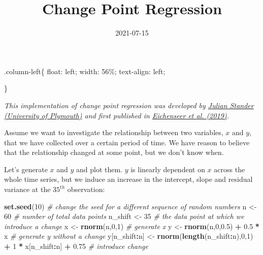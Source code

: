 \documentclass[]{article}
\title{Change Point Regression}
\author{}
\date{\vspace{-2.5em}2021-07-15}
\newenvironment{Shaded}{\begin{snugshade}}{\end{snugshade}}
\newcommand{\KeywordTok}[1]{\textcolor[rgb]{0.13,0.29,0.53}{\textbf{#1}}}
\newcommand{\DecValTok}[1]{\textcolor[rgb]{0.00,0.00,0.81}{#1}}
\newcommand{\FloatTok}[1]{\textcolor[rgb]{0.00,0.00,0.81}{#1}}
\newcommand{\StringTok}[1]{\textcolor[rgb]{0.31,0.60,0.02}{#1}}
\newcommand{\CommentTok}[1]{\textcolor[rgb]{0.56,0.35,0.01}{\textit{#1}}}
\newcommand{\OperatorTok}[1]{\textcolor[rgb]{0.81,0.36,0.00}{\textbf{#1}}}
\newcommand{\NormalTok}[1]{#1}
\begin{document}
\maketitle

.column-left\{ float: left; width: 56\%; text-align: left;

\}

\emph{This implementation of change point regression was developed by
\href{https://www.plymouth.ac.uk/staff/julian-stander}{Julian Stander
(University of Plymouth)} and first published in
\href{https://www.nature.com/articles/s41561-019-0392-9}{Eichenseer et
al. (2019)}.}

Assume we want to investigate the relationship between two variables,
\(x\) and \(y\), that we have collected over a certain period of time.
We have reason to believe that the relationship changed at some point,
but we don't know when.

Let's generate \(x\) and \(y\) and plot them. \(y\) is linearly
dependent on \(x\) across the whole time series, but we induce an
increase in the intercept, slope and residual variance at the
\(35^{th}\) observation:

\begin{Shaded}
\begin{Highlighting}[]
\KeywordTok{set.seed}\NormalTok{(}\DecValTok{10}\NormalTok{) }\CommentTok{# change the seed for a different sequence of random numbers}
\NormalTok{n <-}\StringTok{ }\DecValTok{60} \CommentTok{# number of total data points}
\NormalTok{n_shift <-}\StringTok{ }\DecValTok{35} \CommentTok{# the data point at which we introduce a change}
\NormalTok{x <-}\StringTok{ }\KeywordTok{rnorm}\NormalTok{(n,}\DecValTok{0}\NormalTok{,}\DecValTok{1}\NormalTok{) }\CommentTok{# generate x}
\NormalTok{y <-}\StringTok{ }\KeywordTok{rnorm}\NormalTok{(n,}\DecValTok{0}\NormalTok{,}\FloatTok{0.5}\NormalTok{) }\OperatorTok{+}\StringTok{ }\FloatTok{0.5} \OperatorTok{*}\StringTok{ }\NormalTok{x }\CommentTok{# generate y without a change}
\NormalTok{y[n_shift}\OperatorTok{:}\NormalTok{n] <-}\StringTok{ }\KeywordTok{rnorm}\NormalTok{(}\KeywordTok{length}\NormalTok{(n_shift}\OperatorTok{:}\NormalTok{n),}\DecValTok{0}\NormalTok{,}\DecValTok{1}\NormalTok{) }\OperatorTok{+}\StringTok{ }\DecValTok{1} \OperatorTok{*}\StringTok{ }\NormalTok{x[n_shift}\OperatorTok{:}\NormalTok{n] }\OperatorTok{+}\StringTok{ }\FloatTok{0.75} \CommentTok{# introduce change}
\end{Highlighting}
\end{Shaded}
\end{document}
